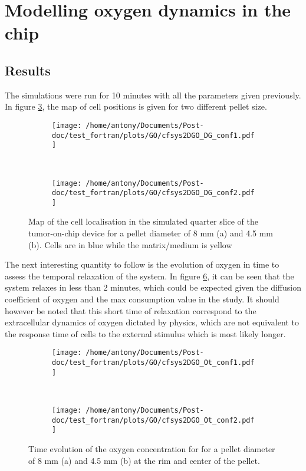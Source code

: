 \documentclass[11pt,a4paper]{article}
\begin{document}
\section{Modelling oxygen dynamics in the chip}
\subsection{Results}
The simulations were run for 10 minutes with all the parameters given previously. In figure \ref{DG_map}, the map of cell positions is given for two different pellet size.  \\

\begin{figure}[ht!]
	\begin{subfigure}{0.45\textwidth}
	\centering
	\texttt{[image: /home/antony/Documents/Post-doc/test\_fortran/plots/GO/cfsys2DGO\_DG\_conf1.pdf]}
	\caption{ \label{DG_conf1}}
	\end{subfigure}
	~~
	\begin{subfigure}{0.45\textwidth}
	\texttt{[image: /home/antony/Documents/Post-doc/test\_fortran/plots/GO/cfsys2DGO\_DG\_conf2.pdf]}
		\caption{ \label{DG_conf2}}
	\end{subfigure}
	\caption{Map of the cell localisation in the simulated quarter slice of the tumor-on-chip device for a pellet diameter of 8 mm (a) and 4.5 mm (b). Cells are in blue while the matrix/medium is yellow \label{DG_map}}
\end{figure}
	
The next interesting quantity to follow is the evolution of oxygen in time to assess the temporal relaxation of the system. In figure \ref{Ot}, it can be seen that the system relaxes in less than 2 minutes, which could be expected given the diffusion coefficient of oxygen and the max consumption value in the study. It should however be noted that this short time of relaxation correspond to the extracellular dynamics of oxygen dictated by physics, which are not equivalent to the response time of cells to the external stimulus which is most likely longer.\\
 
\begin{figure}[ht!]
	\begin{subfigure}{0.45\textwidth}
	\centering
	\texttt{[image: /home/antony/Documents/Post-doc/test\_fortran/plots/GO/cfsys2DGO\_Ot\_conf1.pdf]}
	\caption{ \label{Ot_conf1}}
	\end{subfigure}
	~~
	\begin{subfigure}{0.45\textwidth}
	\texttt{[image: /home/antony/Documents/Post-doc/test\_fortran/plots/GO/cfsys2DGO\_Ot\_conf2.pdf]}
		\caption{ \label{Ot_conf2}}
	\end{subfigure}
	\caption{Time evolution of the oxygen concentration for for a pellet diameter of 8 mm (a) and 4.5 mm (b) at the rim and center of the pellet. \label{Ot}}
\end{figure}
\end{document}
